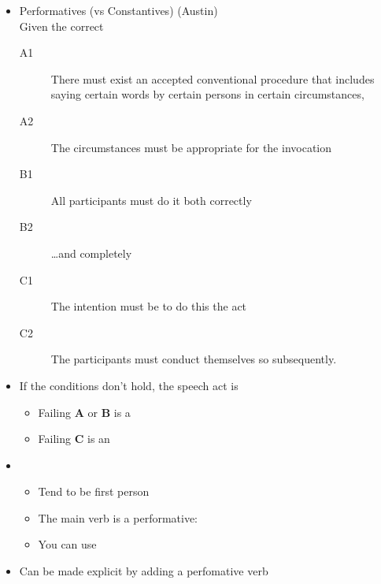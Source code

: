 \documentclass[headrule,footrule]{foils}
\begin{document}
\begin{itemize}
\item Performatives (vs Constantives) \hfill (Austin)
\\ Given the correct 
  \begin{description}
  \item[A1] There must exist an accepted conventional procedure that
    includes saying certain words by certain persons in certain
    circumstances,
  \item[A2] The circumstances must be appropriate for the invocation
  \item[B1] All participants must do it both correctly
  \item[B2] \ldots  and completely
  \item[C1] The intention must be to do this the act
  \item[C2] The participants must conduct themselves so subsequently.
  \end{description}
\item If the conditions don't hold, the speech act is 
  \begin{itemize}
  \item Failing \textbf{A} or \textbf{B} is a 
  \item Failing \textbf{C} is an 
  \end{itemize}
  \end{itemize}

\begin{itemize}
\item {}
  \begin{itemize}
  \item Tend to be first person
  \item The main verb  is a performative: 
  \item You can use 
  \end{itemize}
\item {}
  \begin{exe}
    \ex {}
    \ex {}
    \ex {}
    \ex {}
  \end{exe}
  Can be made explicit by adding a perfomative verb
\end{itemize}
\end{document}
